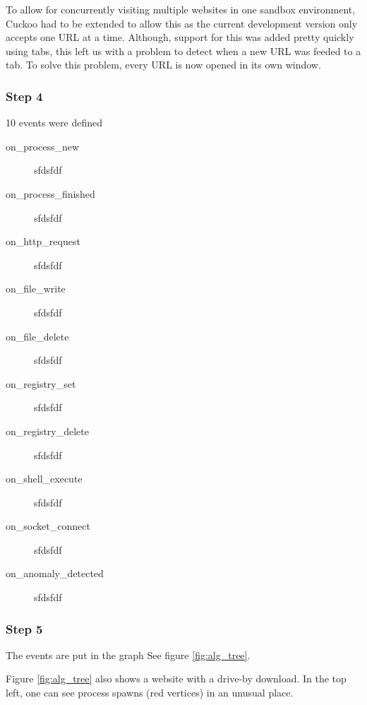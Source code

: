 To allow for concurrently visiting multiple websites in one sandbox environment, Cuckoo had to be extended to allow this as the current development version only accepts one URL at a time. Although, support for this was added pretty quickly using tabs, this left us with a problem to detect when a new URL was feeded to a tab. To solve this problem, every URL is now opened in its own window.

\subsubsection{Step 4}

10 events were defined 

\begin{description}
\item[on\_process\_new] sfdsfdf
\item[on\_process\_finished] sfdsfdf
\item[on\_http\_request] sfdsfdf
\item[on\_file\_write] sfdsfdf
\item[on\_file\_delete] sfdsfdf
\item[on\_registry\_set] sfdsfdf
\item[on\_registry\_delete] sfdsfdf
\item[on\_shell\_execute] sfdsfdf
\item[on\_socket\_connect] sfdsfdf
\item[on\_anomaly\_detected] sfdsfdf
\end{description}

\subsubsection{Step 5}

The events are put in the graph
See figure \ref{fig:alg_tree}. 

Figure \ref{fig:alg_tree} also shows a website with a drive-by download. In the top left, one can see process spawns (red vertices) in an unusual place.

